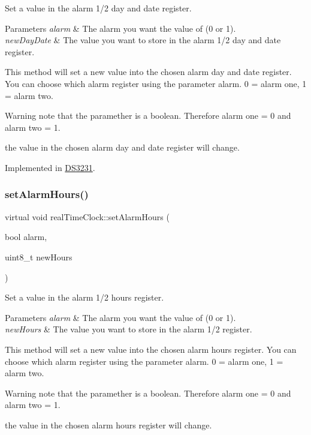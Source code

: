 Set a value in the alarm 1/2 day and date register. 


\begin{DoxyParams}{Parameters}
{\em alarm} & The alarm you want the value of (0 or 1). \\
\hline
{\em new\+Day\+Date} & The value you want to store in the alarm 1/2 day and date register.\\
\hline
\end{DoxyParams}
This method will set a new value into the chosen alarm day and date register. You can choose which alarm register using the parameter alarm. 0 = alarm one, 1 = alarm two. \begin{DoxyWarning}{Warning}
note that the paramether is a boolean. Therefore alarm one = 0 and alarm two = 1. 

the value in the chosen alarm day and date register will change. 
\end{DoxyWarning}


Implemented in \mbox{\hyperlink{class_d_s3231_aa2048cc766ca58f707e84cbc564c1276}{D\+S3231}}.

\mbox{\label{classreal_time_clock_a9f0cd64ce9a783f149fcbb9f7eb36524}} 
\subsubsection{\texorpdfstring{set\+Alarm\+Hours()}{setAlarmHours()}}
{\footnotesize\ttfamily virtual void real\+Time\+Clock\+::set\+Alarm\+Hours (\begin{DoxyParamCaption}\item[{bool}]{alarm,  }\item[{uint8\+\_\+t}]{new\+Hours }\end{DoxyParamCaption})\hspace{0.3cm}{\ttfamily [pure virtual]}}



Set a value in the alarm 1/2 hours register. 


\begin{DoxyParams}{Parameters}
{\em alarm} & The alarm you want the value of (0 or 1). \\
\hline
{\em new\+Hours} & The value you want to store in the alarm 1/2 register.\\
\hline
\end{DoxyParams}
This method will set a new value into the chosen alarm hours register. You can choose which alarm register using the parameter alarm. 0 = alarm one, 1 = alarm two. \begin{DoxyWarning}{Warning}
note that the paramether is a boolean. Therefore alarm one = 0 and alarm two = 1. 

the value in the chosen alarm hours register will change. 
\end{DoxyWarning}


